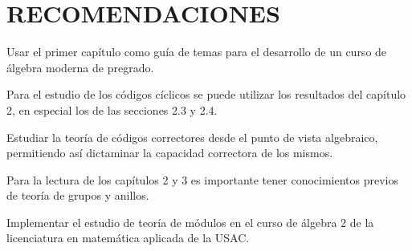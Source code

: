 \chapter*{RECOMENDACIONES}


\begin{bulletList}

\item Usar el primer capítulo como guía de temas para el desarrollo de un curso de álgebra moderna de pregrado. 

\item Para el estudio de los códigos cíclicos se puede utilizar los resultados del capítulo 2, en especial los de las secciones 2.3 y 2.4.

\item Estudiar la teoría de códigos correctores desde el punto de vista algebraico, permitiendo así dictaminar la capacidad correctora de los mismos.

\item Para la lectura de los capítulos 2 y 3 es importante tener conocimientos previos de teoría de grupos y anillos. 

\item Implementar el estudio de teoría de módulos en el curso de álgebra 2 de la licenciatura en matemática aplicada de la USAC.
\end{bulletList}
